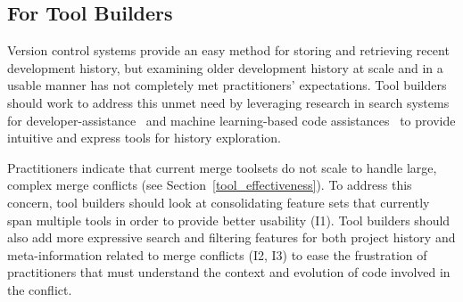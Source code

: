 \subsection{For Tool Builders}
Version control systems provide an easy method for storing and retrieving recent development history, but examining older development history at scale and in a usable manner has not completely met practitioners' expectations.
Tool builders should work to address this unmet need by leveraging research in search systems for developer-assistance~\cite{nabi2016putting} and machine learning-based code assistances~\cite{bradley2011history_exploration} to provide intuitive and express tools for history exploration.

Practitioners indicate that current merge toolsets do not scale to handle large, complex merge conflicts (see Section~\ref{tool_effectiveness}).
To address this concern, tool builders should look at consolidating feature sets that currently span multiple tools in order to provide better usability (I1).
Tool builders should also add more expressive search and filtering features for both project history and meta-information related to merge conflicts (I2, I3) to ease the frustration of practitioners that must understand the context and evolution of code involved in the conflict.